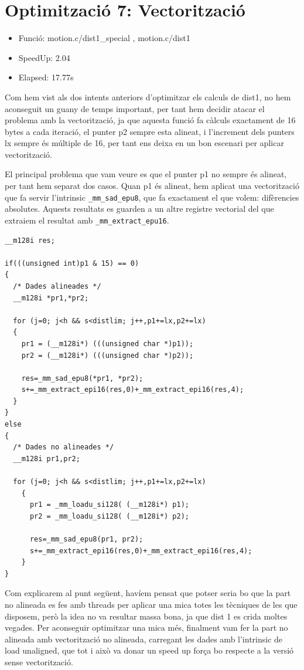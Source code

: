 \section{Optimitzaci\'o 7: Vectoritzaci\'o}
\begin{itemize}
\item{Funció: motion.c/dist1\_special , motion.c/dist1}
\item{SpeedUp: 2.04}
\item{Elapsed: 17.77s}
\end{itemize}

Com hem vist als dos intents anteriors d'optimitzar els calculs de dist1, no hem aconseguit un guany de temps important, per tant hem decidir atacar el problema amb la vectorització, ja que aquesta funció fa càlculs exactament de 16 bytes a cada iteració, el punter p2 sempre esta alineat, i l'increment dels punters lx sempre és múltiple de 16, per tant ens deixa en un bon escenari per aplicar vectorització.

El principal problema que vam veure es que el punter p1 no sempre és alineat, per tant hem separat dos casos. Quan p1 és alineat, hem aplicat una vectorització que fa servir l'intrinsic \texttt{\_mm\_sad\_epu8}, que fa exactament el que volem: difèrencies absolutes. Aquests resultats es guarden a un altre registre vectorial del que extraiem el resultat amb \texttt{\_mm\_extract\_epu16}.

\begin{lstlisting}
__m128i res;  
 
if(((unsigned int)p1 & 15) == 0)
{
  /* Dades alineades */
  __m128i *pr1,*pr2;

  for (j=0; j<h && s<distlim; j++,p1+=lx,p2+=lx)
  {   
    pr1 = (__m128i*) (((unsigned char *)p1));
    pr2 = (__m128i*) (((unsigned char *)p2));
		
    res=_mm_sad_epu8(*pr1, *pr2);
    s+=_mm_extract_epi16(res,0)+_mm_extract_epi16(res,4);
  }
}
else
{
  /* Dades no alineades */
  __m128i pr1,pr2;

  for (j=0; j<h && s<distlim; j++,p1+=lx,p2+=lx)
	{  
	  pr1 = _mm_loadu_si128( (__m128i*) p1);
	  pr2 = _mm_loadu_si128( (__m128i*) p2);
		
	  res=_mm_sad_epu8(pr1, pr2);
	  s+=_mm_extract_epi16(res,0)+_mm_extract_epi16(res,4);
	}  
}   
\end{lstlisting}

Com explicarem al punt següent, havíem pensat que potser seria bo que la part no alineada es fes amb threads per aplicar una mica totes les tècniques de les que disposem, però la idea no va resultar massa bona, ja que dist 1 es crida moltes vegades. Per aconseguir optimitzar una mica més, finalment vam fer la part no alineada amb vectorització no alineada, carregant les dades amb l'intrinsic de load unaligned, que tot i això va donar un speed up força bo respecte a la versió sense vectorització.

